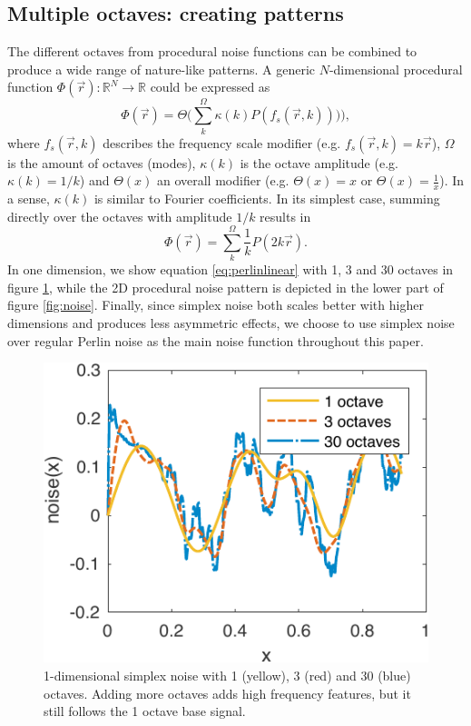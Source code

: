 \documentclass[aps,pre,twocolumn,letterpaper,floatfix,showpacs]{revtex4}
\begin{document}
\subsection{Multiple octaves: creating patterns}
\label{sec:octaves}
The different octaves from procedural noise functions can be combined
to produce a wide range of nature-like patterns. A generic
$N$-dimensional procedural function $\Phi(\vec r): \mathbb R^N \to
\mathbb R$ could be expressed as
\begin{equation}
\label{eq:procedural}
 \Phi(\vec r) = \Theta \Big(\sum_k^\Omega \kappa (k) P(  f_s (\vec r,k) )) \Big),
 \end{equation}
where $f_s(\vec r,k)$ describes the frequency scale modifier (e.g. $f_s(\vec r,k) =
k\vec r$), $\Omega$ is the amount of octaves (modes), $\kappa(k)$ is the octave amplitude (e.g. $\kappa(k) = 1/k$)
and $\Theta(x)$ an overall modifier (e.g. $\Theta(x) = x$ or
$\Theta(x) = \frac{1}{x}$). In a sense, $\kappa(k)$ is similar to Fourier coefficients. 
In its simplest case, summing directly over the octaves with amplitude $1/k$ results in 
\begin{equation}
\label{eq:perlinlinear}
 \Phi(\vec r) = \sum_k^\Omega \frac{1}{k} P( 2k\vec r).
\end{equation}
In one dimension, we show equation \ref{eq:perlinlinear} with 1, 3 and 30 octaves
in figure \ref{fig:1dperlin}, while the 2D procedural noise pattern is depicted in the lower
part of figure \ref{fig:noise}. Finally, since simplex noise both scales better
with higher dimensions and produces less asymmetric effects, we choose to use
simplex noise over regular Perlin noise as the main noise function throughout this paper.

\begin{figure}
\includegraphics[width=.5\textwidth]{fig3.pdf}
\caption{1-dimensional simplex noise with 1 (yellow), 3 (red) and 30 (blue) octaves. Adding more octaves adds high frequency features, but it still follows the 1 octave base signal.}
\label{fig:1dperlin}
\end{figure}
\end{document}
